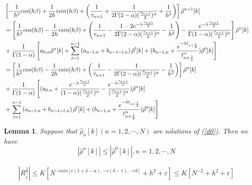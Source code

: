 \documentclass[10pt,a4paper]{amsart}
\newtheorem{lemma}{Lemma}
\begin{document}
\begin{align}
    &\left[-\frac{1}{h^2}cos(h\beta)+\frac{1}{2h}isin(h\beta)+\left(\frac{1}{\tau_{n+1}}+\frac{1}{2\Gamma(2-\alpha)(\frac{\tau_{n+1}}{2})^\alpha}+\frac{1}{h^2}\right) \right]\hat{\rho}^{n+1}[k]\notag \\
    &=\left[\frac{1}{h^2}cos(h\beta)-\frac{1}{2h}isin(h\beta)+\left(\frac{1}{\tau_{n+1}}-\frac{1-2e^{-\lambda \frac{\tau_{n+1}}{2}}}{2\Gamma(2-\alpha)(\frac{\tau_{n+1}}{2})^\alpha}-\frac{1}{h^2}\right) -\frac{e^{-\lambda \frac{\tau_{n+1}}{2}}}{\Gamma(1-\alpha)(\frac{\tau_{n+1}}{2})^\alpha}\right]\hat{\rho}^{n}[k] \notag\\
    &+\frac{1}{\Gamma(1-\alpha)}\left[a_{0, n} \hat{\rho}^{n}[k]+\sum\limits_{l=1}^{n-1} \left(a_{n-l, n}+b_{n-1-l, n}\right) \hat{\rho}^{l}[k]+(b_{n-1, n}+\frac{e^{-\lambda t_{n+\frac{1}{2}}}}{t_{n+\frac{1}{2}}^\alpha}) \hat{\rho}^{0}[k]\right]\notag\\
    &=\left[\frac{1}{h^2}cos(h\beta)-\frac{1}{2h}isin(h\beta)+\left(\frac{1}{\tau_{n+1}}-\frac{1}{2\Gamma(2-\alpha)(\frac{\tau_{n+1}}{2})^\alpha}-\frac{1}{h^2}\right) \right]\hat{\rho}^{n}[k] \notag\\
    &+\frac{1}{\Gamma(1-\alpha)}\left[(a_{0, n} +\frac{e^{-\lambda \frac{\tau_{n+1}}{2}}}{(1-\alpha)(\frac{\tau_{n+1}}{2})^\alpha}-\frac{e^{-\lambda \frac{\tau_{n+1}}{2}}}{(\frac{\tau_{n+1}}{2})^\alpha})\hat{\rho}^{n}[k]\right.\notag\\
    &+\left.\sum\limits_{l=1}^{n-1} \left(a_{n-l, n}+b_{n-1-l, n}\right) \hat{\rho}^{l}[k]+(b_{n-1, n}+\frac{e^{-\lambda t_{n+\frac{1}{2}}}}{t_{n+\frac{1}{2}}^\alpha}) \hat{\rho}^{0}[k]\right]\label{d0}
\end{align}

\begin{lemma}\label{dnd0}
    Suppose that $\hat{\rho}_{n}[k] (n = 1,  2, \cdots,  N)$ are solutions of (\ref{d0}).  Then we have
    $$
    |\hat{\rho}^{n}[k]|\leq |\hat{\rho}^{0}[k]|, n = 1,  2, \cdots,  N
    $$
\end{lemma}

\begin{align}
|R_j^{\frac{1}{2}}|\leq K[N^{-min[r(1+\delta-\alpha), -r(\delta-1), -r\delta]}+h^2+\varepsilon]\leq K[N^{-2}+h^2+\varepsilon] \label{R_half}
\end{align}
\end{document}
